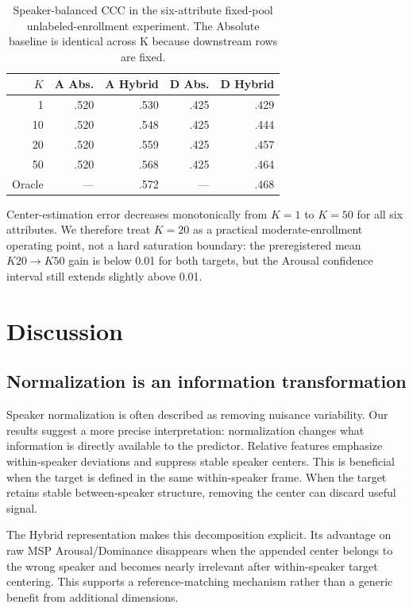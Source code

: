 \documentclass[11pt]{article}
\begin{document}
\begin{table}[t]
\centering
\small
\begin{tabular}{rrrrr}
\toprule
$K$ & A Abs. & A Hybrid & D Abs. & D Hybrid\\
\midrule
1  & .520 & .530 & .425 & .429\\
10 & .520 & .548 & .425 & .444\\
20 & .520 & .559 & .425 & .457\\
50 & .520 & .568 & .425 & .464\\
Oracle & --- & .572 & --- & .468\\
\bottomrule
\end{tabular}
\caption{Speaker-balanced CCC in the six-attribute fixed-pool unlabeled-enrollment experiment. The Absolute baseline is identical across K because downstream rows are fixed.}
\label{tab:kshot}
\end{table}

Center-estimation error decreases monotonically from $K=1$ to $K=50$ for all six attributes.
We therefore treat $K=20$ as a practical moderate-enrollment operating point, not a hard saturation boundary: the preregistered mean $K20\!\rightarrow\!K50$ gain is below 0.01 for both targets, but the Arousal confidence interval still extends slightly above 0.01.

\section{Discussion}

\subsection{Normalization is an information transformation}

Speaker normalization is often described as removing nuisance variability.
Our results suggest a more precise interpretation: normalization changes what information is directly available to the predictor.
Relative features emphasize within-speaker deviations and suppress stable speaker centers.
This is beneficial when the target is defined in the same within-speaker frame.
When the target retains stable between-speaker structure, removing the center can discard useful signal.

The Hybrid representation makes this decomposition explicit.
Its advantage on raw MSP Arousal/Dominance disappears when the appended center belongs to the wrong speaker and becomes nearly irrelevant after within-speaker target centering.
This supports a reference-matching mechanism rather than a generic benefit from additional dimensions.
\end{document}
